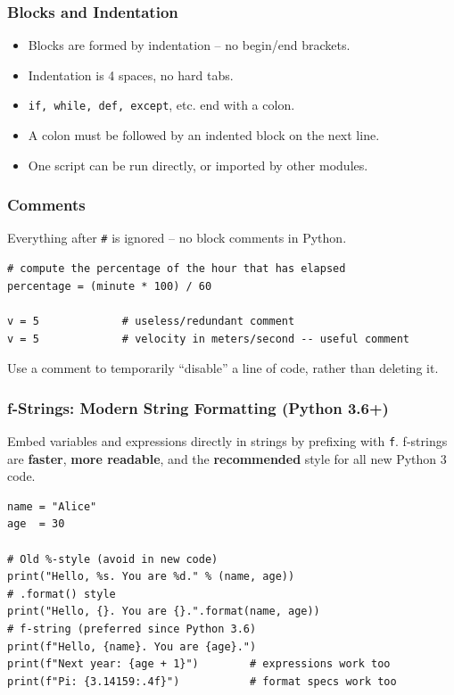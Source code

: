 \begin{frame}[fragile] \frametitle{Blocks and Indentation}
\begin{itemize}
\item Blocks are formed by indentation -- no begin/end brackets.
\item Indentation is 4 spaces, no hard tabs.
\item \lstinline{if, while, def, except}, etc. end with a colon.
\item A colon must be followed by an indented block on the next line.
\item One script can be run directly, or imported by other modules.
\end{itemize}
\end{frame}

\begin{frame}[fragile] \frametitle{Comments}
Everything after \texttt{\#} is ignored -- no block comments in Python.
\begin{lstlisting}
# compute the percentage of the hour that has elapsed
percentage = (minute * 100) / 60

v = 5             # useless/redundant comment
v = 5             # velocity in meters/second -- useful comment
\end{lstlisting}
Use a comment to temporarily ``disable'' a line of code, rather than deleting it.
\end{frame}

\begin{frame}[fragile]\frametitle{f-Strings: Modern String Formatting (Python 3.6+)}
Embed variables and expressions directly in strings by prefixing with \texttt{f}. f-strings are \textbf{faster}, \textbf{more readable}, and the \textbf{recommended} style for all new Python 3 code.
\begin{lstlisting}
name = "Alice"
age  = 30

# Old %-style (avoid in new code)
print("Hello, %s. You are %d." % (name, age))
# .format() style
print("Hello, {}. You are {}.".format(name, age))
# f-string (preferred since Python 3.6)
print(f"Hello, {name}. You are {age}.")
print(f"Next year: {age + 1}")        # expressions work too
print(f"Pi: {3.14159:.4f}")           # format specs work too
\end{lstlisting}
\end{frame}

